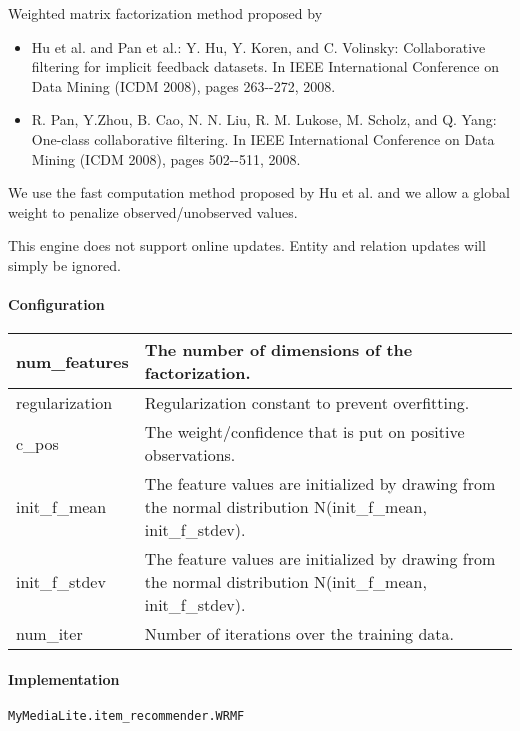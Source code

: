 \documentclass[]{report}
\begin{document}
Weighted matrix factorization method proposed by
\begin{itemize}
\item {
Hu et al. and Pan et al.: Y. Hu, Y. Koren, and C. Volinsky:
Collaborative filtering for implicit feedback datasets. In IEEE
International Conference on Data Mining (ICDM 2008), pages 263-{}-272,
2008.}
\item {
R. Pan, Y.Zhou, B. Cao, N. N. Liu, R. M. Lukose, M. Scholz, and Q. Yang:
One-class collaborative filtering. In IEEE International Conference on
Data Mining (ICDM 2008), pages 502-{}-511, 2008.}
\end{itemize}

We use the fast computation method proposed by Hu et al. and we allow a
global weight to penalize observed/unobserved values.

This engine does not support online updates. Entity and relation updates
will simply be ignored.

\paragraph[Configuration]{Configuration}
\hypertarget{RefHeading1091696489703}{}\begin{flushleft}
\tablehead{}
\begin{supertabular}{|m{1.6712599in}|m{4.6781597in}|}
\hline
 num\_features &
 The number of dimensions of the
factorization.\\\hline
 regularization &
 Regularization constant to prevent
overfitting.\\\hline
 c\_pos &
 The weight/confidence that is put on
positive observations.\\\hline
 init\_f\_mean &
 The feature values are initialized by
drawing from the normal distribution N(init\_f\_mean,
init\_f\_stdev).\\\hline
 init\_f\_stdev &
 The feature values are initialized by
drawing from the normal distribution N(init\_f\_mean,
init\_f\_stdev).\\\hline
 num\_iter &
 Number of iterations over the training
data.\\\hline
\end{supertabular}
\end{flushleft}

\paragraph[Implementation]{Implementation}
\texttt{MyMediaLite.item\_recommender.WRMF}
\end{document}
